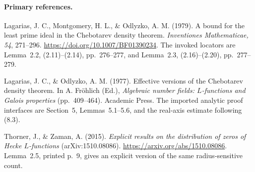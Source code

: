 \paragraph{Primary references.}
Lagarias, J. C., Montgomery, H. L., \& Odlyzko, A. M.
(1979). A bound for the least prime ideal in the
Chebotarev density theorem.
\emph{Inventiones Mathematicae, 54}, 271--296.
\url{https://doi.org/10.1007/BF01390234}.
The invoked locators are Lemma~2.2,
(2.11)--(2.14), pp.~276--277, and Lemma~2.3,
(2.16)--(2.20), pp.~277--279.

Lagarias, J. C., \& Odlyzko, A. M. (1977).
Effective versions of the Chebotarev density theorem.
In A. Fr\"ohlich (Ed.), \emph{Algebraic number fields:
\(L\)-functions and Galois properties} (pp.~409--464).
Academic Press.  The imported analytic proof
interfaces are Section~5, Lemmas~5.1--5.6,
and the real-axis estimate following (8.3).

Thorner, J., \& Zaman, A. (2015).
\emph{Explicit results on the distribution of zeros
of Hecke \(L\)-functions} (arXiv:1510.08086).
\url{https://arxiv.org/abs/1510.08086}.
Lemma~2.5, printed p.~9, gives an explicit
version of the same radius-sensitive count.
